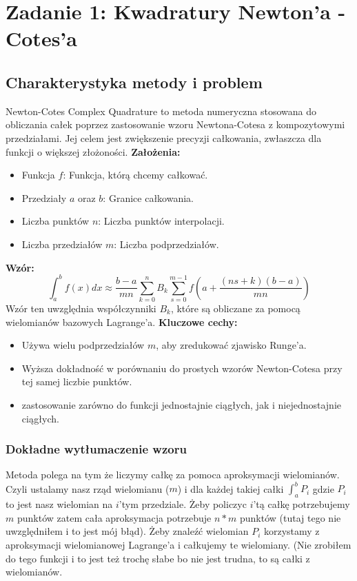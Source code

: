 \section{Zadanie 1: Kwadratury Newton'a - Cotes'a}

\subsection{Charakterystyka metody i problem}
Newton-Cotes Complex Quadrature to metoda numeryczna stosowana do obliczania całek poprzez zastosowanie wzoru Newtona-Cotesa z kompozytowymi przedziałami. Jej celem jest zwiększenie precyzji całkowania, zwłaszcza dla funkcji o większej złożoności.
\textbf{Założenia:}
\begin{itemize}
    \item Funkcja \( f \): Funkcja, którą chcemy całkować.
    \item Przedziały \( a \) oraz \( b \): Granice całkowania.
    \item Liczba punktów \( n \): Liczba punktów interpolacji.
    \item Liczba przedziałów \( m \): Liczba podprzedziałów.
\end{itemize}
\textbf{Wzór:}
\[
\int_a^b f(x)dx \approx \frac{b-a}{mn} \sum_{k=0}^n B_k \sum_{s=0}^{m-1} f(a + \frac{(ns + k)(b-a)}{mn})
\]
Wzór ten uwzględnia współczynniki \( B_k \), które są obliczane za pomocą wielomianów bazowych Lagrange'a.
\textbf{Kluczowe cechy:}
\begin{itemize}
    \item Używa wielu podprzedziałów \( m \), aby zredukować zjawisko Runge'a.
    \item Wyższa dokładność w porównaniu do prostych wzorów Newton-Cotesa przy tej samej liczbie punktów.
    \item zastosowanie zarówno do funkcji jednostajnie ciągłych, jak i niejednostajnie ciągłych.
\end{itemize}
\subsubsection{Dokładne wytłumaczenie wzoru}
Metoda polega na tym że liczymy całkę za pomoca aproksymacji wielomianów. Czyli ustalamy nasz rząd wielomianu ($m$) i dla każdej takiej całki $\int_a^b P_i$ gdzie $P_i$ to jest nasz wielomian na $i$'tym przedziale. Żeby policzyc $i$'tą całkę potrzebujemy $m$ punktów zatem cała aproksymacja potrzebuje $n * m$ punktów (tutaj tego nie uwzględniłem i to jest mój błąd). Żeby znaleźć wielomian $P_i$ korzystamy z aproksymacji wielomianowej Lagrange'a i całkujemy te wielomiany. (Nie zrobiłem do tego funkcji i to jest też trochę słabe bo nie jest trudna, to są całki z wielomianów. 


